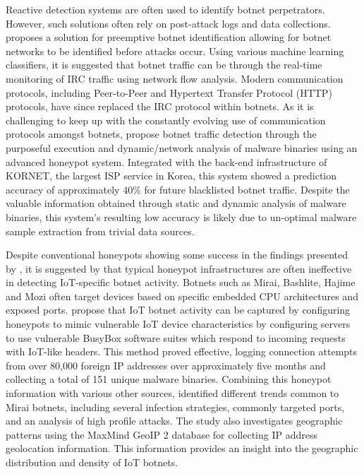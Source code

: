 Reactive detection systems are often used to identify botnet perpetrators. However, such solutions often rely on post-attack logs and data collections. \citet{Lividas2006} proposes a solution for preemptive botnet identification allowing for botnet networks to be identified before attacks occur. Using various machine learning classifiers, it is suggested that botnet traffic can be through the real-time monitoring of IRC traffic using network flow analysis. Modern communication protocols, including Peer-to-Peer and Hypertext Transfer Protocol (HTTP) protocols, have since replaced the IRC protocol within botnets. As it is challenging to keep up with the constantly evolving use of communication protocols amongst botnets, \citet{Moon2012} propose botnet traffic detection through the purposeful execution and dynamic/network analysis of malware binaries using an advanced honeypot system. Integrated with the back-end infrastructure of KORNET, the largest ISP service in Korea, this system showed a prediction accuracy of approximately 40\% for future blacklisted botnet traffic. Despite the valuable information obtained through static and dynamic analysis of malware binaries, this system's resulting low accuracy is likely due to un-optimal malware sample extraction from trivial data sources.

Despite conventional honeypots showing some success in the findings presented by \citet{Moon2012}, it is suggested by \citet{Malwaremustdie2016} that typical honeypot infrastructures are often ineffective in detecting IoT-specific botnet activity. Botnets such as Mirai, Bashlite, Hajime and Mozi often target devices based on specific embedded CPU architectures and exposed ports. \citet{Antonakakis2017} propose that IoT botnet activity can be captured by configuring honeypots to mimic vulnerable IoT device characteristics by configuring servers to use vulnerable BusyBox software suites which respond to incoming requests with IoT-like headers. This method proved effective, logging connection attempts from over 80,000 foreign IP addresses over approximately five months and collecting a total of 151 unique malware binaries. Combining this honeypot information with various other sources, \citet{Antonakakis2017} identified different trends common to Mirai botnets, including several infection strategies, commonly targeted ports, and an analysis of high profile attacks. The study also investigates geographic patterns using the MaxMind GeoIP 2 database for collecting IP address geolocation information. This information provides an insight into the geographic distribution and density of IoT botnets. 

